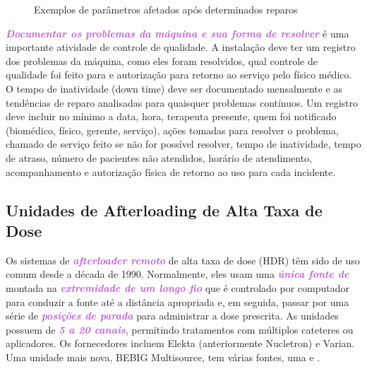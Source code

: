\documentclass[11pt,a4paper]{article}
\begin{document}
	\begin{figure}[!h]
		\centering
		\caption{Exemplos de parâmetros afetados após determinados reparos}
		\label{fig:qaAposReparo}
	\end{figure}

	\textcolor{MediumOrchid}{\textbf{\textit{Documentar os problemas da máquina e sua forma de resolver}}} é uma importante atividade de controle de qualidade. A instalação deve ter um registro dos problemas da máquina, como eles foram resolvidos, qual controle de qualidade foi feito para e autorização para retorno ao serviço pelo físico médico. O tempo de inatividade (down time) deve ser documentado mensalmente e as tendências de reparo analisadas para quaisquer problemas contínuos. Um registro deve incluir no mínimo a data, hora, terapeuta presente, quem foi notificado (biomédico, físico, gerente, serviço), ações tomadas para resolver o problema, chamado de serviço feito se não for possível resolver, tempo de inatividade, tempo de atraso, número de pacientes não atendidos, horário de atendimento, acompanhamento e autorização física de retorno ao uso para cada incidente.

\subsection*{Unidades de Afterloading de Alta Taxa de Dose}

	Os sistemas de \textcolor{MediumOrchid}{\textbf{\textit{afterloader remoto}}} de alta taxa de dose (HDR) têm sido de uso comum desde a década de 1990. Normalmente, eles usam uma \textcolor{MediumOrchid}{\textbf{\textit{única fonte de }}} montada na \textcolor{MediumOrchid}{\textbf{\textit{extremidade de um longo fio}}} que é controlado por computador para conduzir a fonte até a distância apropriada e, em seguida, passar por uma série de \textcolor{MediumOrchid}{\textbf{\textit{posições de parada}}} para administrar a dose prescrita. As unidades possuem de \textcolor{MediumOrchid}{\textbf{\textit{5 a 20 canais}}}, permitindo tratamentos com múltiplos cateteres ou aplicadores. Os fornecedores incluem Elekta (anteriormente Nucletron) e Varian. Uma unidade mais nova, BEBIG Multisource, tem várias fontes, uma  e .
\end{document}
